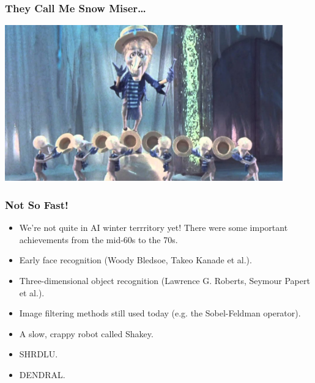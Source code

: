 \documentclass[10pt]{beamer}
\begin{document}
  \begin{frame}
    \frametitle{They Call Me Snow Miser\ldots}

    \includegraphics[width=0.9\textwidth]{snow-miser.jpg}
  \end{frame}

  \begin{frame}
    \frametitle{Not So Fast!}

    \begin{itemize}
      \item We're not quite in AI winter terrritory yet! There were some
        important achievements from the mid-60s to the 70s.
      \pause
      \item Early face recognition (Woody Bledsoe, Takeo Kanade et al.).
      \pause
      \item Three-dimensional object recognition (Lawrence G. Roberts, Seymour
        Papert et al.).
      \pause
      \item Image filtering methods still used today (e.g. the Sobel-Feldman
        operator).
      \pause
      \item A slow, crappy robot called Shakey.
      \pause
      \item SHRDLU.
      \pause
      \item DENDRAL.
    \end{itemize}
  \end{frame}
\end{document}

